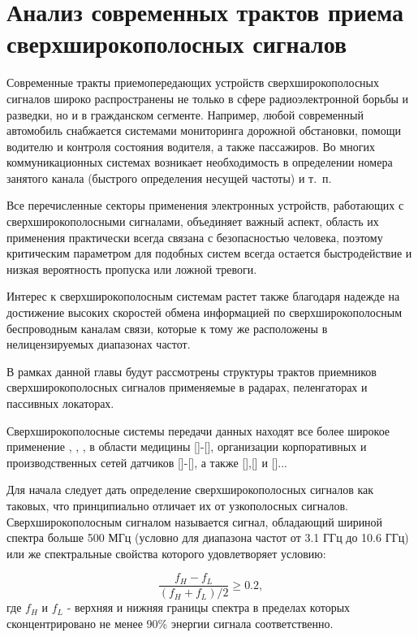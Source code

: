 \chapter{Анализ современных трактов приема сверхширокополосных сигналов}

Современные тракты приемопередающих устройств сверхширокополосных сигналов широко распространены не только в сфере радиоэлектронной борьбы и разведки, но и в гражданском сегменте. Например, любой современный автомобиль снабжается системами мониторинга дорожной обстановки, помощи водителю и контроля состояния водителя, а также пассажиров. Во многих коммуникационных системах возникает необходимость в определении номера занятого канала (быстрого определения несущей частоты) и т.~п.

Все перечисленные секторы применения электронных устройств, работающих с сверхширокополосными сигналами, объединяет важный аспект, область их применения практически всегда связана с безопасностью человека, поэтому критическим параметром для подобных систем всегда остается быстродействие и низкая вероятность пропуска или ложной тревоги.

Интерес к сверхширокополосным системам растет также благодаря надежде на достижение высоких скоростей обмена информацией по сверхширокополосным беспроводным каналам связи, которые к тому же расположены в нелицензируемых диапазонах частот.

В рамках данной главы будут рассмотрены структуры трактов приемников сверхширокополосных сигналов применяемые в радарах, пеленгаторах и пассивных локаторах.

Сверхширокополосные системы передачи данных находят все более широкое применение \cite{wosbib1}, \cite{vakbib1}, \cite{vakbib2}, \cite{scbib1} в области медицины []-[], организации корпоративных и производственных сетей датчиков []-[], а также [],[] и []...

Для начала следует дать определение сверхширокополосных сигналов как таковых, что принципиально отличает их от узкополосных сигналов. Сверхширокополосным сигналом называется сигнал, обладающий шириной спектра больше 500 МГц (условно для диапазона частот от 3.1 ГГц до 10.6 ГГц) или же спектральные свойства которого удовлетворяет условию:

\begin{equation*}
\frac{f_H - f_L}{(f_H + f_L)/2} \geqslant 0.2 ,
\label{eq:ubw_condition}
\end{equation*}
где \(f_H\) и \(f_L\) - верхняя и нижняя границы спектра в пределах которых сконцентрировано не менее 90\% энергии сигнала соответственно.

